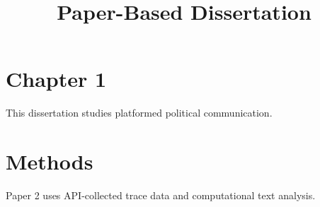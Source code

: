 \documentclass{article}
\begin{document}
\title{Paper-Based Dissertation}
\maketitle

\section{Chapter 1}
This dissertation studies platformed political communication.

\section{Methods}
Paper 2 uses API-collected trace data and computational text analysis.
\end{document}
